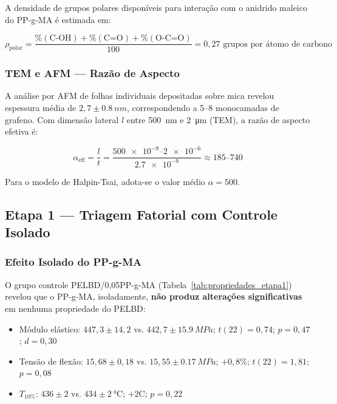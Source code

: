 \documentclass[12pt,a4paper,twoside]{article}
\begin{document}
A densidade de grupos polares disponíveis para interação com o anidrido maleico do PP-g-MA é estimada em:

\begin{equation}
\rho_{\text{polar}} = \frac{\%(\text{C-OH}) + \%(\text{C=O}) + \%(\text{O-C=O})}{100} = 0,27 \text{ grupos por átomo de carbono}
\label{eq:polar_density}
\end{equation}

\subsubsection{TEM e AFM — Razão de Aspecto}

A análise por AFM de folhas individuais depositadas sobre mica revelou espessura média de $2,7 \pm \SI{0,8}{nm}$, correspondendo a 5--8 monocamadas de grafeno. Com dimensão lateral $l$ entre \SI{500}{nm} e \SI{2}{\micro\meter} (TEM), a razão de aspecto efetiva é:

\begin{equation}
\alpha_{\text{eff}} = \frac{l}{t} = \frac{\num{500e-9} \text{--} \num{2e-6}}{\num{2,7e-9}} \approx 185\text{--}740
\label{eq:aspect_ratio}
\end{equation}

Para o modelo de Halpin-Tsai, adota-se o valor médio $\alpha = 500$.

\subsection{Etapa 1 — Triagem Fatorial com Controle Isolado}

\subsubsection{Efeito Isolado do PP-g-MA}

O grupo controle PELBD/0,05PP-g-MA (Tabela~\ref{tab:propriedades_etapa1}) revelou que o PP-g-MA, isoladamente, \textbf{não produz alterações significativas} em nenhuma propriedade do PELBD:

\begin{itemize}[nosep]
    \item Módulo elástico: $447,3 \pm 14,2$ vs. $442,7 \pm \SI{15,9}{MPa}$; $t(22) = 0,74$; $p = 0,47$; $d = 0,30$
    \item Tensão de flexão: $15,68 \pm 0,18$ vs. $15,55 \pm \SI{0,17}{MPa}$; $+0,8\%$; $t(22) = 1,81$; $p = 0,08$
    \item $T_{10\%}$: $436 \pm 2$ vs. $434 \pm \SI{2}{\celsius}$; $+2$\textdegree C; $p = 0,22$
\end{itemize}
\end{document}
